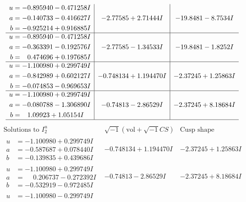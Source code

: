\documentclass[1p]{elsarticle_modified}
\theoremstyle{definition}
\newcommand{\I}{\sqrt{-1}}
\begin{document}
$$\begin{array}{c|c|c}
\begin{aligned}
u &= -0.895940 - 0.471258 I \\
a &= -0.140733 - 0.416627 I \\
b &= -0.925214 + 0.916885 I\end{aligned}
 & -2.77585 + 2.71444 I & -19.8481 - 8.7534 I \\ \hline\begin{aligned}
u &= -0.895940 - 0.471258 I \\
a &= -0.363391 - 0.192576 I \\
b &= \phantom{-}0.474696 + 0.197685 I\end{aligned}
 & -2.77585 - 1.34533 I & -19.8481 - 1.8252 I \\ \hline\begin{aligned}
u &= -1.100980 + 0.299749 I \\
a &= -0.842989 + 0.602127 I \\
b &= -0.074853 - 0.969653 I\end{aligned}
 & -0.748134 + 1.194470 I & -2.37245 + 1.25863 I \\ \hline\begin{aligned}
u &= -1.100980 + 0.299749 I \\
a &= -0.080788 - 1.306890 I \\
b &= \phantom{-}1.09923 + 1.05154 I\end{aligned}
 & -0.74813 - 2.86529 I & -2.37245 + 8.18684 I\\
 \hline 
 \end{array}$$\newpage$$\begin{array}{c|c|c}  
\text{Solutions to }I^u_{2}& \I (\text{vol} + \sqrt{-1}CS) & \text{Cusp shape}\\
 \hline 
\begin{aligned}
u &= -1.100980 + 0.299749 I \\
a &= -0.587687 + 0.078440 I \\
b &= -0.139835 + 0.439686 I\end{aligned}
 & -0.748134 + 1.194470 I & -2.37245 + 1.25863 I \\ \hline\begin{aligned}
u &= -1.100980 + 0.299749 I \\
a &= \phantom{-}0.206737 - 0.272392 I \\
b &= -0.532919 - 0.972485 I\end{aligned}
 & -0.74813 - 2.86529 I & -2.37245 + 8.18684 I \\ \hline\begin{aligned}
u &= -1.100980 - 0.299749 I \\

\end{aligned}
\end{array}$$
\end{document}
